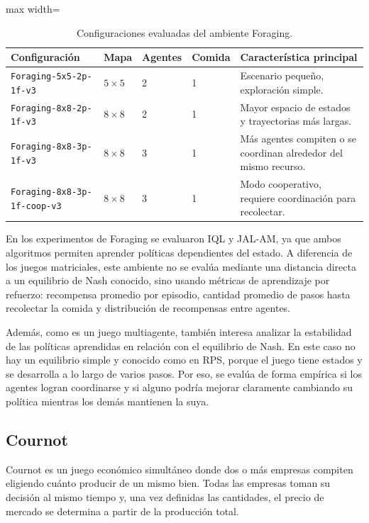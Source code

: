 \documentclass[letterpaper,12pt]{article} %
\begin{document}
\begin{table}[H]
    \centering
    \begin{adjustbox}{max width=\textwidth}
    \begin{tabular}{lllll}
        \toprule
        Configuración & Mapa & Agentes & Comida & Característica principal \\
        \midrule
        \texttt{Foraging-5x5-2p-1f-v3} & $5 \times 5$ & 2 & 1 & Escenario pequeño, exploración simple. \\
        \texttt{Foraging-8x8-2p-1f-v3} & $8 \times 8$ & 2 & 1 & Mayor espacio de estados y trayectorias más largas. \\
        \texttt{Foraging-8x8-3p-1f-v3} & $8 \times 8$ & 3 & 1 & Más agentes compiten o se coordinan alrededor del mismo recurso. \\
        \texttt{Foraging-8x8-3p-1f-coop-v3} & $8 \times 8$ & 3 & 1 & Modo cooperativo, requiere coordinación para recolectar. \\
        \bottomrule
    \end{tabular}
    \end{adjustbox}
    \caption{Configuraciones evaluadas del ambiente Foraging.}
\end{table}

En los experimentos de Foraging se evaluaron IQL y JAL-AM, ya que ambos algoritmos permiten aprender políticas dependientes del estado. A diferencia de los juegos matriciales, este ambiente no se evalúa mediante una distancia directa a un equilibrio de Nash conocido, sino usando métricas de aprendizaje por refuerzo: recompensa promedio por episodio, cantidad promedio de pasos hasta recolectar la comida y distribución de recompensas entre agentes.

Además, como es un juego multiagente, también interesa analizar la estabilidad de las políticas aprendidas en relación con el equilibrio de Nash. En este caso no hay un equilibrio simple y conocido como en RPS, porque el juego tiene estados y se desarrolla a lo largo de varios pasos. Por eso, se evalúa de forma empírica si los agentes logran coordinarse y si alguno podría mejorar claramente cambiando su política mientras los demás mantienen la suya.


\subsection{Cournot}

Cournot es un juego económico simultáneo donde dos o más empresas compiten eligiendo cuánto producir de un mismo bien. Todas las empresas toman su decisión al mismo tiempo y, una vez definidas las cantidades, el precio de mercado se determina a partir de la producción total.
\end{document}
